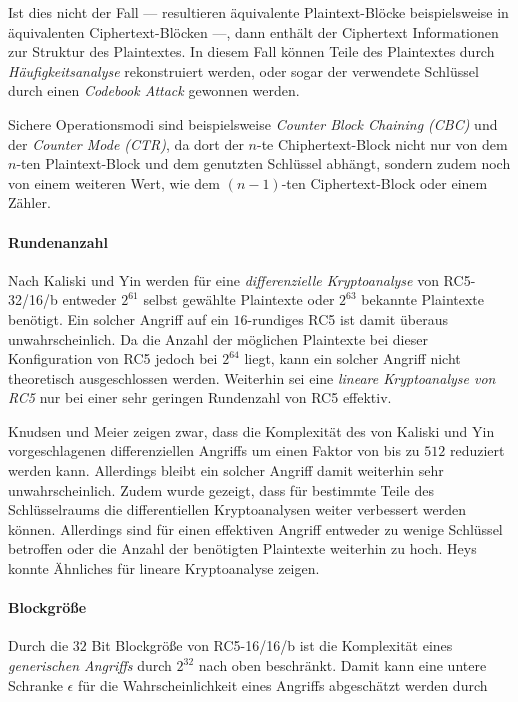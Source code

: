 \documentclass[course=erap]{aspdoc}
\begin{document}
Ist dies nicht der Fall --- resultieren äquivalente Plaintext-Blöcke beispielsweise in äquivalenten Ciphertext-Blöcken ---, dann enthält der Ciphertext Informationen zur Struktur des Plaintextes\cite[p.22]{bsi}. In diesem Fall können Teile des Plaintextes durch \textit{Häufigkeitsanalyse} rekonstruiert werden\cite[p.22]{bsi}, oder sogar der verwendete Schlüssel durch einen \textit{Codebook Attack} gewonnen werden\cite[p.2]{elbaz}.\bigbreak

Sichere Operationsmodi sind beispielsweise \textit{Counter Block Chaining (CBC)} und der \textit{Counter Mode (CTR)}, da dort der $n$-te Chiphertext-Block nicht nur von dem $n$-ten Plaintext-Block und dem genutzten Schlüssel abhängt, sondern zudem noch von einem weiteren Wert, wie dem $(n-1)$-ten Ciphertext-Block oder einem Zähler.\cite[p.22]{bsi}

\paragraph{Rundenanzahl} Nach Kaliski und Yin werden für eine \textit{differenzielle Kryptoanalyse} von RC5-32/16/b entweder $2^{61}$ selbst gewählte Plaintexte oder $2^{63}$ bekannte Plaintexte benötigt. Ein solcher Angriff auf ein $16$-rundiges RC5 ist damit überaus unwahrscheinlich. Da die Anzahl der möglichen Plaintexte bei dieser Konfiguration von RC5 jedoch bei $2^{64}$ liegt, kann ein solcher Angriff nicht theoretisch ausgeschlossen werden.\cite[p.6]{kaliski+yin} Weiterhin sei eine \textit{lineare Kryptoanalyse von RC5} nur bei einer sehr geringen Rundenzahl von RC5 effektiv.\cite[p.28]{kaliski+yin}\bigbreak

Knudsen und Meier zeigen zwar, dass die Komplexität des von Kaliski und Yin vorgeschlagenen differenziellen Angriffs um einen Faktor von bis zu $512$ reduziert werden kann.\cite[p.2]{knudsen+meier} Allerdings bleibt ein solcher Angriff damit weiterhin sehr unwahrscheinlich. Zudem wurde gezeigt, dass für bestimmte Teile des Schlüsselraums die differentiellen Kryptoanalysen weiter verbessert werden können.\cite[p.13]{knudsen+meier} Allerdings sind für einen effektiven Angriff entweder zu wenige Schlüssel betroffen oder die Anzahl der benötigten Plaintexte weiterhin zu hoch. Heys konnte Ähnliches für lineare Kryptoanalyse zeigen.\cite[p.5]{heys}\bigbreak

\paragraph{Blockgröße} Durch die $32$ Bit Blockgröße von RC5-16/16/b ist die Komplexität eines \textit{generischen Angriffs} durch $2^{32}$ nach oben beschränkt. Damit kann eine untere Schranke $\epsilon$ für die Wahrscheinlichkeit eines Angriffs abgeschätzt werden durch
\end{document}
